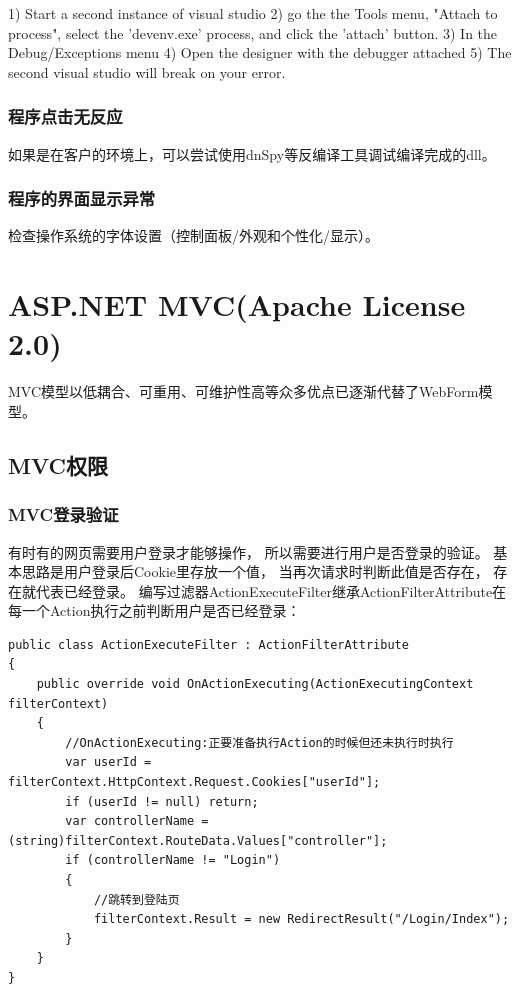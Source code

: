 \documentclass{book}
\begin{document}
1) Start a second instance of visual studio
2) go the the Tools menu, "Attach to process", select the 'devenv.exe' process, and click the 'attach' button.
3) In the Debug/Exceptions menu 
4) Open the designer with the debugger attached
5) The second visual studio will break on your error.

\subsection{程序点击无反应}

如果是在客户的环境上，可以尝试使用dnSpy等反编译工具调试编译完成的dll。

\subsection{程序的界面显示异常}

检查操作系统的字体设置（控制面板/外观和个性化/显示）。

\chapter{ASP.NET MVC(Apache License 2.0)}

MVC模型以低耦合、可重用、可维护性高等众多优点已逐渐代替了WebForm模型。

\clearpage
\mbox{}         
\clearpage

\section{MVC权限}

\subsection{MVC登录验证}

有时有的网页需要用户登录才能够操作，
所以需要进行用户是否登录的验证。
基本思路是用户登录后Cookie里存放一个值，
当再次请求时判断此值是否存在，
存在就代表已经登录。
编写过滤器ActionExecuteFilter继承ActionFilterAttribute在每一个Action执行之前判断用户是否已经登录：

\begin{lstlisting}[language={[Sharp]C}]
public class ActionExecuteFilter : ActionFilterAttribute
{
    public override void OnActionExecuting(ActionExecutingContext filterContext)
    {
        //OnActionExecuting:正要准备执行Action的时候但还未执行时执行
        var userId = filterContext.HttpContext.Request.Cookies["userId"];
        if (userId != null) return;
        var controllerName = (string)filterContext.RouteData.Values["controller"];
        if (controllerName != "Login")
        {
            //跳转到登陆页
            filterContext.Result = new RedirectResult("/Login/Index");
        }
    }
}
\end{lstlisting}
\end{document}
